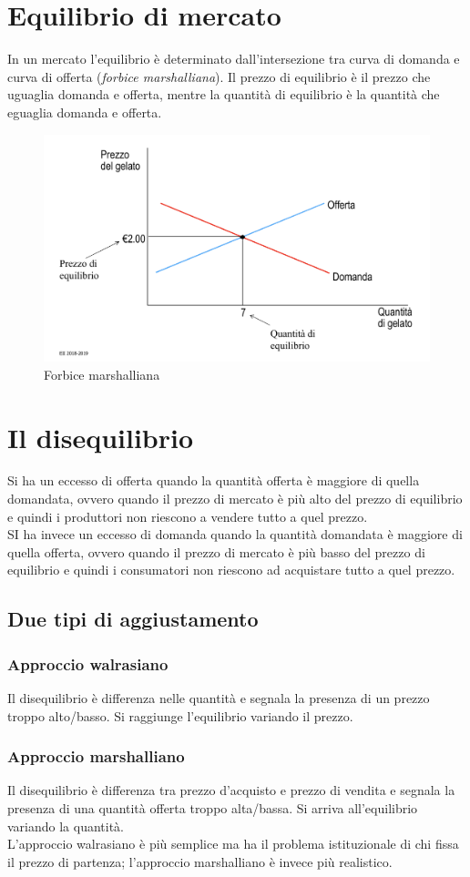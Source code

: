 \documentclass{report}
\begin{document}
	\section{Equilibrio di mercato}
	In un mercato l'equilibrio è determinato dall'intersezione tra curva di domanda e curva di offerta (\textit{forbice marshalliana}). Il prezzo di equilibrio è il prezzo che uguaglia domanda e offerta, mentre la quantità di equilibrio è la quantità che eguaglia domanda e offerta.
	\begin{figure}[h]
		\centering
		\includegraphics[width=0.7\linewidth]{images/forbice-marshalliana}
		\caption[Forbice marshalliana]{Forbice marshalliana}
		\label{fig:forbice-marshalliana}
	\end{figure}
	\section{Il disequilibrio}
	Si ha un eccesso di offerta quando la quantità offerta è maggiore di quella domandata, ovvero quando il prezzo di mercato è più alto del prezzo di equilibrio e quindi i produttori non riescono a vendere tutto a quel prezzo.
	\medskip \\
	SI ha invece un eccesso di domanda quando la quantità domandata è maggiore di quella offerta, ovvero quando il prezzo di mercato è più basso del prezzo di equilibrio e quindi i consumatori non riescono ad acquistare tutto a quel prezzo.
	\subsection{Due tipi di aggiustamento}
	\subsubsection{Approccio walrasiano}
	Il disequilibrio è differenza nelle quantità e segnala la presenza di un prezzo troppo alto/basso. Si raggiunge l'equilibrio variando il prezzo.
	\subsubsection{Approccio marshalliano}
	Il disequilibrio è differenza tra prezzo d'acquisto e prezzo di vendita e segnala la presenza di una quantità offerta troppo alta/bassa. Si arriva all'equilibrio variando la quantità.
	\medskip \\L'approccio walrasiano è più semplice ma ha il problema istituzionale di chi fissa il prezzo di partenza; l'approccio marshalliano è invece più realistico.
\end{document}
